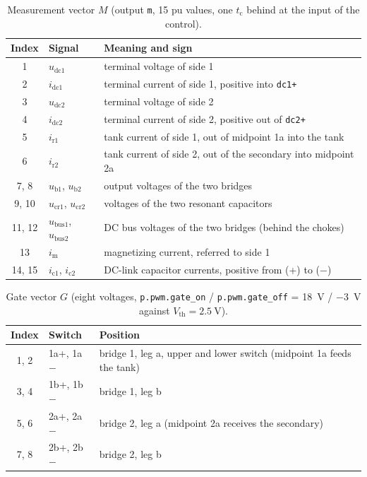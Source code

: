 \documentclass[12pt,a4paper]{scrartcl}
\newcommand{\ped}[1]{_{\mathrm{#1}}}
\newcommand{\code}[1]{\texttt{#1}}
\begin{document}
\begin{onehalfspace}
\begin{table}[H]
	\centering
	\captionsetup{width=0.9\textwidth, font=small}
	\caption[Measurement vector of the block.]{Measurement vector $M$ (output \code{m}, 15 pu values, one $t\ped{c}$ behind at the input of the control).}
	\label{tab:meas}
	\begin{tabularx}{0.95\textwidth}{@{} c l X @{}}
		\toprule
		\textbf{Index} & \textbf{Signal} & \textbf{Meaning and sign} \\
		\midrule
		1 & $u\ped{dc1}$ & terminal voltage of side 1 \\
		2 & $i\ped{dc1}$ & terminal current of side 1, positive into \code{dc1+} \\
		3 & $u\ped{dc2}$ & terminal voltage of side 2 \\
		4 & $i\ped{dc2}$ & terminal current of side 2, positive out of \code{dc2+} \\
		5 & $i\ped{r1}$ & tank current of side 1, out of midpoint 1a into the tank \\
		6 & $i\ped{r2}$ & tank current of side 2, out of the secondary into midpoint 2a \\
		7, 8 & $u\ped{b1}$, $u\ped{b2}$ & output voltages of the two bridges \\
		9, 10 & $u\ped{cr1}$, $u\ped{cr2}$ & voltages of the two resonant capacitors \\
		11, 12 & $u\ped{bus1}$, $u\ped{bus2}$ & DC bus voltages of the two bridges (behind the chokes) \\
		13 & $i\ped{m}$ & magnetizing current, referred to side 1 \\
		14, 15 & $i\ped{c1}$, $i\ped{c2}$ & DC-link capacitor currents, positive from (+) to ($-$) \\
		\bottomrule
	\end{tabularx}
\end{table}

\begin{table}[H]
	\centering
	\captionsetup{width=0.9\textwidth, font=small}
	\caption[Gate vector of the block.]{Gate vector $G$ (eight voltages, \code{p.pwm.gate\_on} / \code{p.pwm.gate\_off} = \SI{18}{\volt} / \SI{-3}{\volt} against $V\ped{th} = \SI{2.5}{\volt}$).}
	\label{tab:gates}
	\begin{tabularx}{0.95\textwidth}{@{} c l X @{}}
		\toprule
		\textbf{Index} & \textbf{Switch} & \textbf{Position} \\
		\midrule
		1, 2 & 1a+, 1a$-$ & bridge 1, leg a, upper and lower switch (midpoint 1a feeds the tank) \\
		3, 4 & 1b+, 1b$-$ & bridge 1, leg b \\
		5, 6 & 2a+, 2a$-$ & bridge 2, leg a (midpoint 2a receives the secondary) \\
		7, 8 & 2b+, 2b$-$ & bridge 2, leg b \\
		\bottomrule
	\end{tabularx}
\end{table}


\end{onehalfspace}
\end{document}

